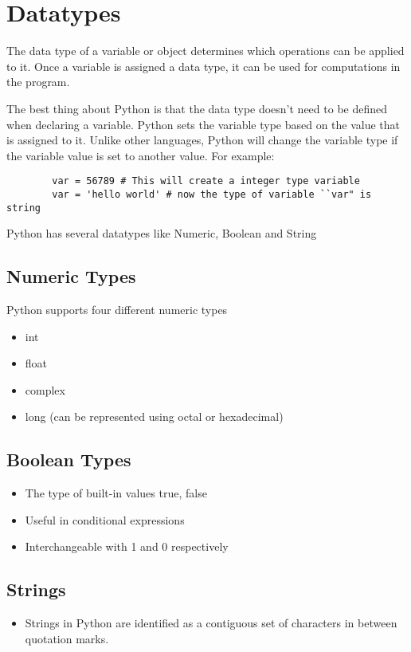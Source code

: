 \documentclass[]{book}
\begin{document}
    \section*{Datatypes}
    The data type of a variable or object determines which operations can be applied to it. Once a variable is assigned a data type, it can be used for computations in the program.

    The best thing about Python is that the data type doesn’t need to be defined when declaring a variable. Python sets the variable type based on the value that is assigned to it. Unlike other languages, Python will change the variable type if the variable value is set to another value. For example:
    \begin{verbatim}
        var = 56789 # This will create a integer type variable
        var = 'hello world' # now the type of variable ``var" is string
    \end{verbatim}

    Python has several datatypes like Numeric, Boolean and String
    \subsection*{Numeric Types}
    Python supports four different numeric types
    \begin{itemize}
        \item int
        \item float
        \item complex
        \item long (can be represented using octal or hexadecimal)
    \end{itemize}
    \subsection*{Boolean Types}
    \begin{itemize}
        \item The type of built-in values true, false
        \item Useful in conditional expressions
        \item Interchangeable with 1 and 0 respectively
    \end{itemize}
    \subsection*{Strings}
    \begin{itemize}
        \item Strings in Python are identified as a contiguous set of characters in between quotation marks.
    \end{itemize}
\end{document}
